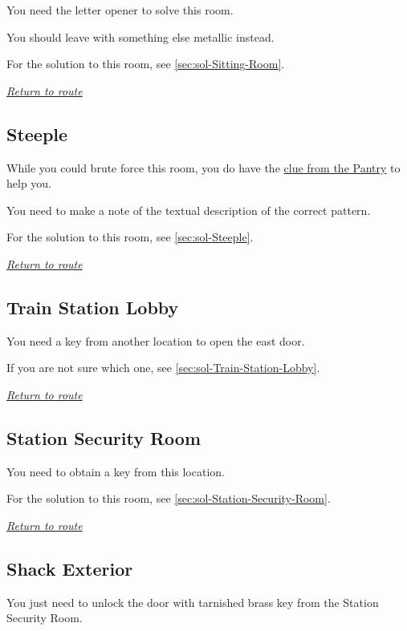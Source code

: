 \documentclass[a5paper]{extarticle}
\begin{document}
You need the letter opener to solve this room.

You should leave with something else metallic instead.

For the solution to this room, see \cref{sec:sol-Sitting-Room}.

\hyperref[sec:route-13]{\emph{Return to route}}

\newpage
\subsection{Steeple}\label{sec:req-Steeple}

While you could brute force this room,
you do have the \hyperref[sec:nb-Pantry]{clue from the Pantry} to help you.

You need to make a note of the textual description of the correct pattern.

For the solution to this room, see \cref{sec:sol-Steeple}.

\hyperref[sec:route-13]{\emph{Return to route}}

\newpage
\subsection{Train Station Lobby}\label{sec:req-Train-Station-Lobby}

You need a key from another location to open the east door.

If you are not sure which one, see \cref{sec:sol-Train-Station-Lobby}.

\hyperref[sec:route-13]{\emph{Return to route}}

\newpage
\subsection{Station Security Room}\label{sec:req-Station-Security-Room}

You need to obtain a key from this location.

For the solution to this room, see \cref{sec:sol-Station-Security-Room}.

\hyperref[sec:route-13]{\emph{Return to route}}

\newpage
\subsection{Shack Exterior}\label{sec:req-Shack-Exterior}

You just need to unlock the door with tarnished brass key
from the Station Security Room.
\end{document}
